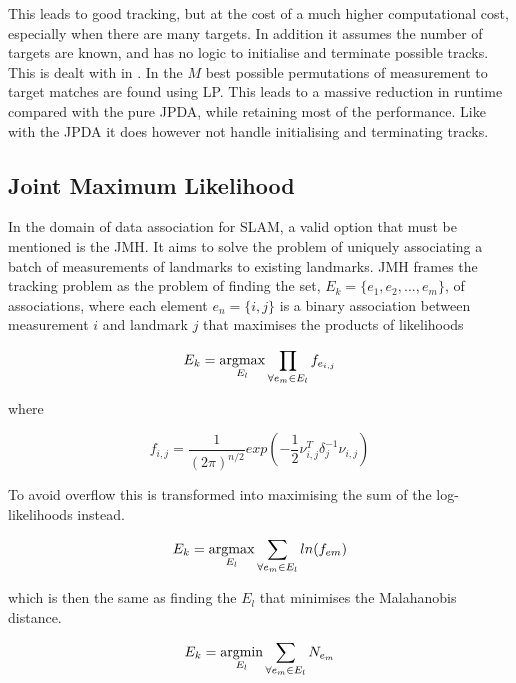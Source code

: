 This leads to good tracking, but at the cost of a much higher computational cost, especially when there are many targets. In addition it assumes the number of targets are known, and has no logic to initialise and terminate possible tracks. This is dealt with in \cite{Multitrack}. In \cite{JPDARev} the $M$ best possible permutations of measurement to target matches are found using \gls{LP}. This leads to a massive reduction in runtime compared with the pure \gls{JPDA}, while retaining most of the performance. Like with the \gls{JPDA} it does however not handle initialising and terminating tracks. 

\subsection{Joint Maximum Likelihood}

In the domain of data association for \gls{SLAM}, a valid option that must be mentioned is the \gls{JMH}\cite{JMH}. It aims to solve the problem of uniquely associating a batch of measurements of landmarks to existing landmarks. \gls{JMH} frames the tracking problem as the problem of finding the set, $E_k = \{ e_1, e_2, ... , e_m\} $, of associations, where each element $e_n = \{i,j\}$ is a binary association between measurement $i$ and landmark $j$ that maximises the products of likelihoods

\begin{equation}
    E_k = \operatorname*{argmax}_{E_l} \prod_{\forall e_m \in E_l} f_{e_{i,j}}
\end{equation}

where 

\begin{equation}
    f_{i,j} = \frac{1}{(2\pi)^{n/2}} exp(-\frac{1}{2}\nu_{i,j}^T\delta_j^{-1}\nu_{i,j})
\end{equation}

To avoid overflow this is transformed into maximising the sum of the log-likelihoods instead.

\begin{equation}
    E_k = \operatorname*{argmax}_{E_l} \sum_{\forall e_m \in E_l} ln(f_{em})
\end{equation}

which is then the same as finding the $E_l$ that minimises the Malahanobis distance.

\begin{equation}
    E_k = \operatorname*{argmin}_{E_l} \sum_{\forall e_m \in E_l} N_{e_m}
\end{equation}

